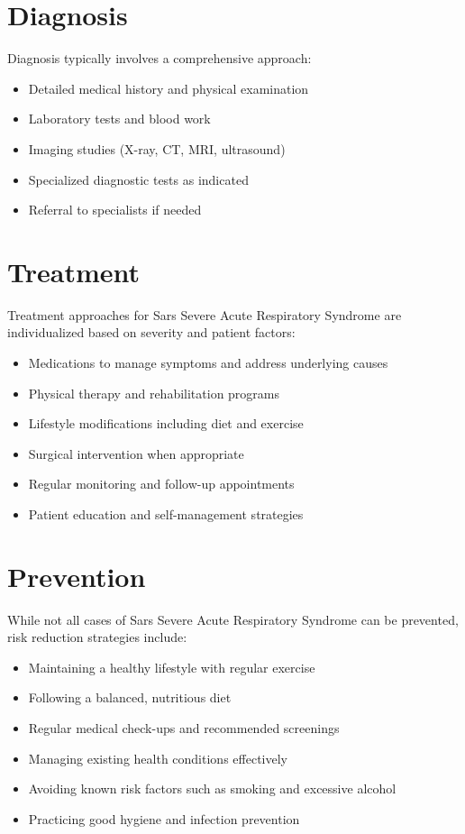 \section*{Diagnosis}
Diagnosis typically involves a comprehensive approach:

\begin{itemize}
\item Detailed medical history and physical examination
\item Laboratory tests and blood work
\item Imaging studies (X-ray, CT, MRI, ultrasound)
\item Specialized diagnostic tests as indicated
\item Referral to specialists if needed
\end{itemize}

\section*{Treatment}
Treatment approaches for Sars Severe Acute Respiratory Syndrome are individualized based on severity and patient factors:

\begin{itemize}
\item Medications to manage symptoms and address underlying causes
\item Physical therapy and rehabilitation programs
\item Lifestyle modifications including diet and exercise
\item Surgical intervention when appropriate
\item Regular monitoring and follow-up appointments
\item Patient education and self-management strategies
\end{itemize}

\section*{Prevention}
While not all cases of Sars Severe Acute Respiratory Syndrome can be prevented, risk reduction strategies include:

\begin{itemize}
\item Maintaining a healthy lifestyle with regular exercise
\item Following a balanced, nutritious diet
\item Regular medical check-ups and recommended screenings
\item Managing existing health conditions effectively
\item Avoiding known risk factors such as smoking and excessive alcohol
\item Practicing good hygiene and infection prevention
\end{itemize}

